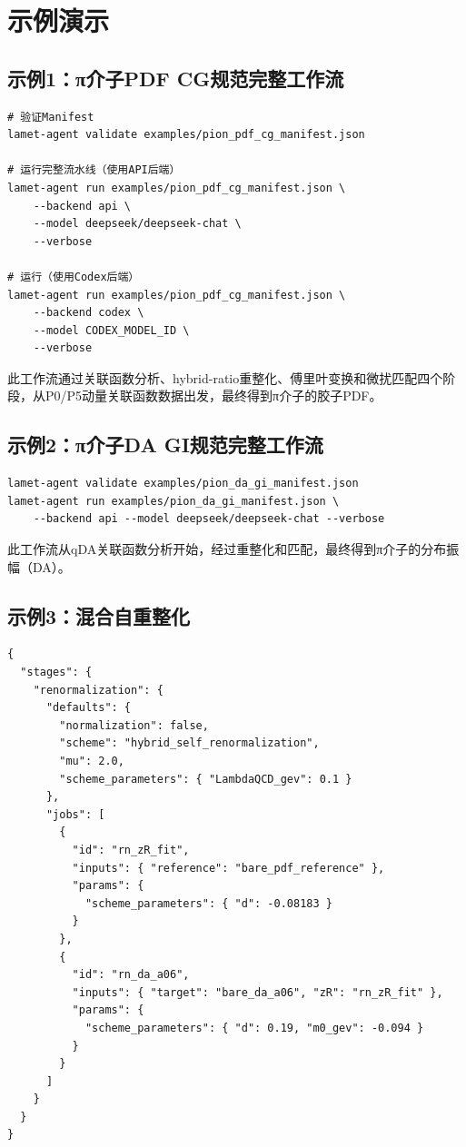 \documentclass[12pt,a4paper]{ctexart}
\begin{document}
\section{示例演示}

\subsection{示例1：π介子PDF CG规范完整工作流}

\begin{lstlisting}[caption={运行π介子PDF完整工作流}]
# 验证Manifest
lamet-agent validate examples/pion_pdf_cg_manifest.json

# 运行完整流水线（使用API后端）
lamet-agent run examples/pion_pdf_cg_manifest.json \
    --backend api \
    --model deepseek/deepseek-chat \
    --verbose

# 运行（使用Codex后端）
lamet-agent run examples/pion_pdf_cg_manifest.json \
    --backend codex \
    --model CODEX_MODEL_ID \
    --verbose
\end{lstlisting}

此工作流通过关联函数分析、hybrid-ratio重整化、傅里叶变换和微扰匹配四个阶段，从P0/P5动量关联函数数据出发，最终得到π介子的胶子PDF。

\subsection{示例2：π介子DA GI规范完整工作流}

\begin{lstlisting}[caption={运行π介子DA工作流}]
lamet-agent validate examples/pion_da_gi_manifest.json
lamet-agent run examples/pion_da_gi_manifest.json \
    --backend api --model deepseek/deepseek-chat --verbose
\end{lstlisting}

此工作流从qDA关联函数分析开始，经过重整化和匹配，最终得到π介子的分布振幅（DA）。

\subsection{示例3：混合自重整化}

\begin{lstlisting}[caption={混合自重整化Manifest片段}]
{
  "stages": {
    "renormalization": {
      "defaults": {
        "normalization": false,
        "scheme": "hybrid_self_renormalization",
        "mu": 2.0,
        "scheme_parameters": { "LambdaQCD_gev": 0.1 }
      },
      "jobs": [
        {
          "id": "rn_zR_fit",
          "inputs": { "reference": "bare_pdf_reference" },
          "params": {
            "scheme_parameters": { "d": -0.08183 }
          }
        },
        {
          "id": "rn_da_a06",
          "inputs": { "target": "bare_da_a06", "zR": "rn_zR_fit" },
          "params": {
            "scheme_parameters": { "d": 0.19, "m0_gev": -0.094 }
          }
        }
      ]
    }
  }
}
\end{lstlisting}
\end{document}
